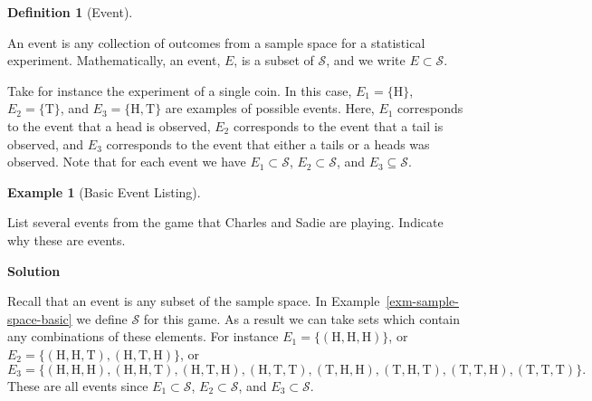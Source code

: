 \documentclass[
  letterpaper,
  DIV=11,
  numbers=noendperiod]{scrreprt}
\theoremstyle{definition}
\theoremstyle{definition}
\newtheorem{example}{Example}[chapter]
\theoremstyle{definition}
\newtheorem{definition}{Definition}[chapter]
\theoremstyle{remark}
\begin{document}
\begin{definition}[Event]\protect\hypertarget{def-event}{}\label{def-event}

An event is any collection of outcomes from a sample space for a
statistical experiment. Mathematically, an event, \(E\), is a subset of
\(\mathcal{S}\), and we write \(E\subset\mathcal{S}\).

\end{definition}

Take for instance the experiment of a single coin. In this case,
\(E_1 = \{\text{H}\}\), \(E_2 = \{\text{T}\}\), and
\(E_3 = \{\text{H},\text{T}\}\) are examples of possible events. Here,
\(E_1\) corresponds to the event that a head is observed, \(E_2\)
corresponds to the event that a tail is observed, and \(E_3\)
corresponds to the event that either a tails or a heads was observed.
Note that for each event we have \(E_1 \subset \mathcal{S}\),
\(E_2 \subset \mathcal{S}\), and \(E_3 \subseteq \mathcal{S}\).

\begin{example}[Basic Event
Listing]\protect\hypertarget{exm-basic-events}{}\label{exm-basic-events}

List several events from the game that Charles and Sadie are playing.
Indicate why these are events.

\begin{tcolorbox}[enhanced jigsaw, colback=white, colframe=quarto-callout-color-frame, arc=.35mm, leftrule=.75mm, rightrule=.15mm, opacityback=0, breakable, bottomrule=.15mm, left=2mm, toprule=.15mm]

\vspace{-3mm}\textbf{Solution}\vspace{3mm}

Recall that an event is any subset of the sample space. In
Example~\ref{exm-sample-space-basic} we define \(\mathcal{S}\) for this
game. As a result we can take sets which contain any combinations of
these elements. For instance \(E_1 = \{(\text{H},\text{H},\text{H})\}\),
or
\(E_2 = \{(\text{H},\text{H},\text{T}), (\text{H},\text{T},\text{H})\}\),
or
\[E_3 = \{(\text{H},\text{H},\text{H}), (\text{H},\text{H},\text{T}), (\text{H},\text{T},\text{H}), (\text{H},\text{T},\text{T}), (\text{T},\text{H},\text{H}), (\text{T},\text{H},\text{T}), (\text{T},\text{T},\text{H}), (\text{T},\text{T},\text{T})\}.\]
These are all events since \(E_1 \subset \mathcal{S}\),
\(E_2 \subset \mathcal{S}\), and \(E_3 \subset \mathcal{S}\).

\end{tcolorbox}

\end{example}
\end{document}
